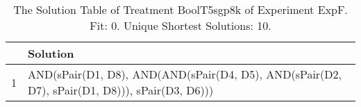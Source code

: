 \begin{table}[ht]
\centering
\begin{tabular}{rp{9cm}}
  \hline
 & Solution \\ 
  \hline
1 & AND(sPair(D1, D8), AND(AND(sPair(D4, D5), AND(sPair(D2, D7), sPair(D1, D8))), sPair(D3, D6))) \\ 
   \hline
\end{tabular}
\caption{The Solution Table of Treatment BoolT5sgp8k of Experiment ExpF. Fit: 0. Unique Shortest Solutions: 10.} 
\end{table}
